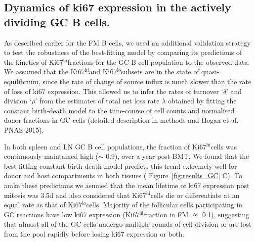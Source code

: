\documentclass[11pt]{article}
\newcommand{\khi}{Ki67$^\text{hi}$}
\newcommand{\klo}{Ki67$^\text{lo}$}
\begin{document}
	\subsection*{Dynamics of ki67 expression in the actively dividing GC B cells.}
	As described earlier for the FM B cells, we used an additional validation strategy to test the robustness of the best-fitting model by comparing its predictions of the kinetics of \khi fractions for the GC B cell population to the observed data.
	We assumed that the \khi and \klo subsets are in the state of quasi-equilibrium, since the rate of change of source influx is much slower than the rate of loss of ki67 expression.
	This allowed us to infer the rates of turnover `$\delta$' and division `$\rho$' from the estimates of total net loss rate $\lambda$ obtained by fitting the constant birth-death model to the time-course of cell counts and normalised donor fractions in GC cells (detailed description in methods and Hogan et al. PNAS 2015).
	
	In both spleen and LN GC B cell populations, the fraction of \khi cells was continuously maintained high ($\sim$ 0.9), over a year post-BMT.
	We found that the best-fitting constant birth-death model predicts this trend extremely well for donor and host compartments in both tissues ( Figure~\ref{fig:results_GC} C).
	To amke these predictions we asumed that the mean lifetime of ki67 expression post mitosis was 3.5d and also considered that \khi cells die or differentiate at an equal rate as that of \klo cells.
	Majority of the follicular cells participating in GC reactions have low ki67 expression (\khi fraction in FM $\approxeq$ 0.1), suggesting that almost all of the GC cells undergo multiple rounds of cell-division or are lost from the pool rapidly before losing ki67 expression or both. 
	
	 
\end{document}
